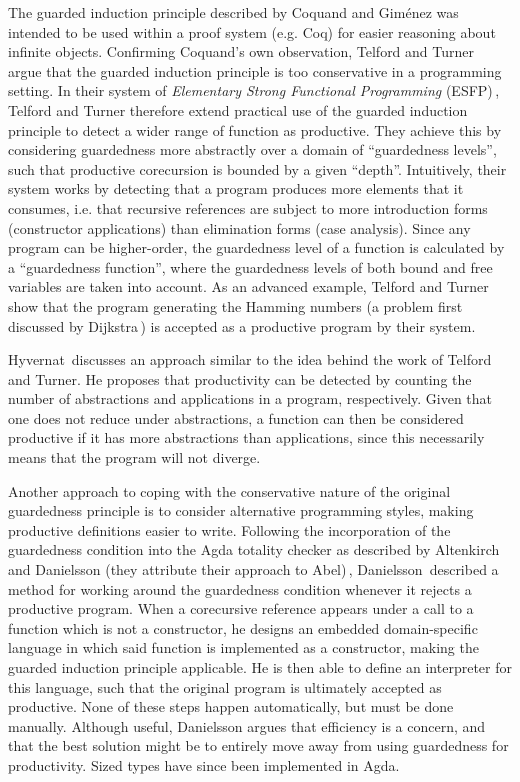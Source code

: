 The guarded induction principle described by Coquand and Gim\'{e}nez was intended to be used within a proof system (e.g. Coq) for easier reasoning about infinite objects. Confirming Coquand's own observation, Telford and Turner\,\citep{Telford98ensuringthe} argue that the guarded induction principle is too conservative in a programming setting. In their system of \emph{Elementary Strong Functional Programming} (ESFP)\,\citep{Telford97ensuringstreams,Telford98ensuringthe,Telford:jucs_6_4:ensuring_termination_in_esfp}, Telford and Turner therefore extend practical use of the guarded induction principle to detect a wider range of function as productive. They achieve this by considering guardedness more abstractly over a domain of ``guardedness levels'', such that productive corecursion is bounded by a given ``depth''. Intuitively, their system works by detecting that a program produces more elements that it consumes, i.e. that recursive references are subject to more introduction forms (constructor applications) than elimination forms (case analysis). Since any program can be higher-order, the guardedness level of a function is calculated by a ``guardedness function'',  where the guardedness levels of both bound and free variables are taken into account. As an advanced example, Telford and Turner show that the program generating the Hamming numbers (a problem first discussed by Dijkstra\,\citep{Dijkstra:1997}) is accepted as a productive program by their system.

Hyvernat\,\citep{Hyvernat13} discusses an approach similar to the idea behind the work of Telford and Turner. He proposes that productivity can be detected by counting the number of abstractions and applications in a program, respectively. Given that one does not reduce under abstractions, a function can then be considered productive if it has more abstractions than applications, since this necessarily means that the program will not diverge.

Another approach to coping with the conservative nature of the original guardedness principle is to consider alternative programming styles, making productive definitions easier to write. Following the incorporation of the guardedness condition into the Agda totality checker as described by Altenkirch and Danielsson (they attribute their approach to Abel)\,\citep{AltenkirchNAD10}, Danielsson\,\citep{Danielsson10beatingthe} described a method for working around the guardedness condition whenever it rejects a productive program. When a corecursive reference appears under a call to a function which is not a constructor, he designs an embedded domain-specific language in which said function is implemented as a constructor, making the guarded induction principle applicable. He is then able to define an interpreter for this language, such that the original program is ultimately accepted as productive. None of these steps happen automatically, but must be done manually. Although useful, Danielsson argues that efficiency is a concern, and that the best solution might be to entirely move away from using guardedness for productivity. Sized types have since been implemented in Agda.

